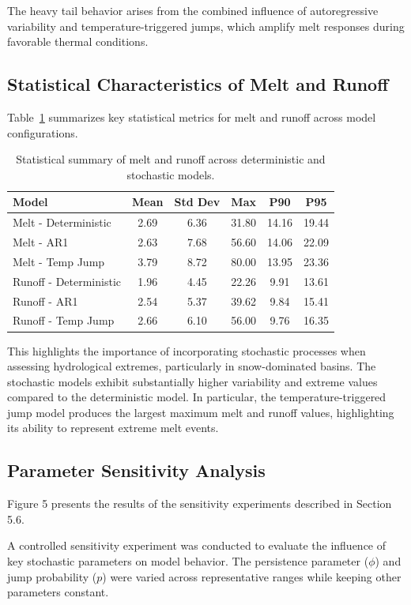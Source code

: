 \documentclass[11pt]{article}
\begin{document}
The heavy tail behavior arises from the combined influence of autoregressive variability and temperature-triggered jumps, which amplify melt responses during favorable thermal conditions.

\subsection{Statistical Characteristics of Melt and Runoff}

Table~\ref{tab:stats} summarizes key statistical metrics for melt and runoff across model configurations.

\begin{table}[htbp]
	\centering
	\caption{Statistical summary of melt and runoff across deterministic and stochastic models.}
	\label{tab:stats}
	\begin{tabular}{lccccc}
		\hline
		Model & Mean & Std Dev & Max & P90 & P95 \\
		\hline
		Melt - Deterministic & 2.69 & 6.36 & 31.80 & 14.16 & 19.44 \\
		Melt - AR1 & 2.63 & 7.68 & 56.60 & 14.06 & 22.09 \\
		Melt - Temp Jump & 3.79 & 8.72 & 80.00 & 13.95 & 23.36 \\
		Runoff - Deterministic & 1.96 & 4.45 & 22.26 & 9.91 & 13.61 \\
		Runoff - AR1 & 2.54 & 5.37 & 39.62 & 9.84 & 15.41 \\
		Runoff - Temp Jump & 2.66 & 6.10 & 56.00 & 9.76 & 16.35 \\
		\hline
	\end{tabular}
\end{table}

This highlights the importance of incorporating stochastic processes when assessing hydrological extremes, particularly in snow-dominated basins. The stochastic models exhibit substantially higher variability and extreme values compared to the deterministic model. In particular, the temperature-triggered jump model produces the largest maximum melt and runoff values, highlighting its ability to represent extreme melt events.

\subsection{Parameter Sensitivity Analysis}

Figure 5 presents the results of the sensitivity experiments described in Section 5.6. 

A controlled sensitivity experiment was conducted to evaluate the influence of key stochastic parameters on model behavior. The persistence parameter ($\phi$) and jump probability ($p$) were varied across representative ranges while keeping other parameters constant. 
\end{document}
